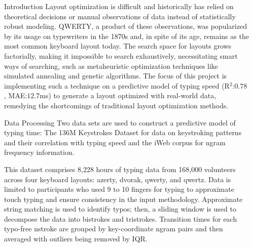\documentclass[final,20pt]{beamer}
\newlength{\sepwidth}
\newlength{\colwidth}
\newcommand{\separatorcolumn}{\begin{column}{\sepwidth}\end{column}}
\begin{document}
\begin{frame}[t]
\begin{columns}[t]
\separatorcolumn

\begin{column}{\colwidth}
  \begin{alertblock}{Introduction}
Layout optimization is difficult and historically has relied on theoretical decisions or manual observations of data instead of statistically robust modeling. QWERTY, a product of these observations, was popularized by its usage on typewriters in the 1870s and, in spite of its age, remains as the most common keyboard layout today. The search space for layouts grows factorially, making it impossible to search exhaustively, necessitating smart ways of searching, such as metaheuristic optimization techniques like simulated annealing and genetic algorithms. The focus of this project is implementing such a technique on a predictive model of typing speed (R$^2$:$0.78$, MAE:$12.7$ms) to generate a layout optimized with real-world data, remedying the shortcomings of traditional layout optimization methods.



  \end{alertblock}

\begin{block}{Data Processing}
      Two data sets are used to construct a predictive model of typing time: The 136M Keystrokes Dataset for data on keystroking patterns and their correlation with typing speed and the iWeb corpus for ngram frequency information.

    This dataset comprises 8,228 hours of typing data from 168,000 volunteers across four keyboard layouts: azerty, dvorak, qwerty, and qwertz. Data is limited to participants who used 9 to 10 fingers for typing to approximate touch typing and ensure consistency in the input methodology. Approximate string matching is used to identify typos; then, a sliding window is used to decompose the data into bistrokes and tristrokes. Transition times for each typo-free nstroke are grouped by key-coordinate ngram pairs and then averaged with outliers being removed by IQR.



\end{block}
\end{column}
\end{columns}
\end{frame}
\end{document}
